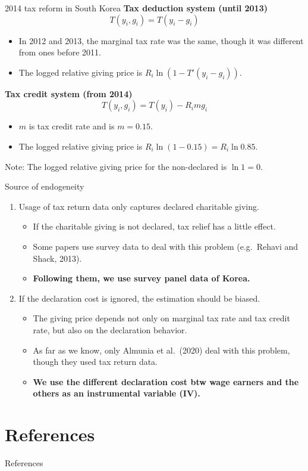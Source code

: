 \documentclass[
  ignorenonframetext,
  aspectratio=169,
]{beamer}
\providecommand{\tightlist}{%
  \setlength{\itemsep}{0pt}\setlength{\parskip}{0pt}}
\begin{document}
\begin{frame}{2014 tax reform in South Korea}
\protect\hypertarget{tax-reform-in-south-korea-3}{}
\textbf{Tax deduction system (until 2013)}
\[T(y_{i}, g_{i}) = T(y_{i} - g_{i})\]

\begin{itemize}
\tightlist
\item
  In 2012 and 2013, the marginal tax rate was the same, though it was different from ones before 2011.
\item
  The logged relative giving price is \(R_{i}\ln(1 - T'(y_{i} - g_{i}))\).
\end{itemize}

\textbf{Tax credit system (from 2014)}
\[T(y_{i}, g_{i}) = T(y_{i}) - R_{i} m g_{i}\]

\begin{itemize}
\tightlist
\item
  \(m\) is tax credit rate and is \(m = 0.15\).
\item
  The logged relative giving price is \(R_{i}\ln(1 - 0.15) = R_{i}\ln 0.85\).
\end{itemize}

Note: The logged relative giving price for the non-declared is \(\ln1 =0\).
\end{frame}

\begin{frame}{Source of endogeneity}
\protect\hypertarget{source-of-endogeneity}{}
\begin{enumerate}
\tightlist
\item
  Usage of tax return data only captures declared charitable giving.

  \begin{itemize}
  \tightlist
  \item
    If the charitable giving is not declared, tax relief has a little effect.
  \item
    Some papers use survey data to deal with this problem (e.g.~Rehavi and Shack, 2013).
  \item
    \textbf{Following them, we use survey panel data of Korea.}
  \end{itemize}
\item
  If the declaration cost is ignored, the estimation should be biased.

  \begin{itemize}
  \tightlist
  \item
    The giving price depends not only on marginal tax rate and tax credit rate, but also on the declaration behavior.
  \item
    As far as we know, only Almunia et al.~(2020) deal with this problem, though they used tax return data.
  \item
    \textbf{We use the different declaration cost btw wage earners and the others as an instrumental variable (IV).}
  \end{itemize}
\end{enumerate}
\end{frame}

\hypertarget{references}{%
\section*{References}\label{references}}

\begin{frame}{References}
\hypertarget{refs_main}{}
\end{frame}
\end{document}
